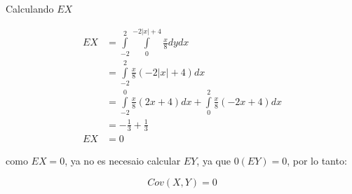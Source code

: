 Calculando $EX$

\begin{align*}
    EX & =  \int\limits_{-2}^2 \int\limits_{0}^{-2|x|+4} \frac{x}{8}dydx                   \\
       & =  \int\limits_{-2}^2 \frac{x}{8}(-2|x|+4)dx                                      \\
       & = \int\limits_{-2}^0 \frac{x}{8}(2x+4)dx + \int\limits_{0}^2 \frac{x}{8}(-2x+4)dx \\
       & = -\frac{1}{3} + \frac{1}{3}                                                      \\
    EX & = 0
\end{align*}

como $EX=0$, ya no es necesaio calcular $EY$, ya que $0(EY)=0$, por lo tanto:

\begin{equation*}
    Cov(X,Y) = 0
\end{equation*}